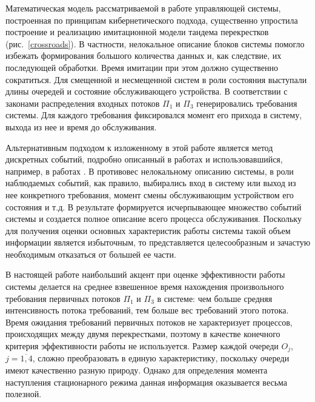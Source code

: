 
Математическая модель рассматриваемой в работе управляющей системы, построенная по принципам кибернетического подхода, существенно упростила построение и реализацию имитационной модели тандема перекрестков (рис.~\ref{crossroads}). В частности, нелокальное описание блоков системы помогло избежать формирования большого количества данных и, как следствие, их последующей обработки. Время имитации при этом должно существенно сократиться. Для смещенной и несмещенной систем в роли состояния выступали длины очередей и состояние обслуживающего устройства. В соответствии с законами распределения входных потоков  $\Pi_1$ и $\Pi_3$ генерировались требования системы. Для каждого требования фиксировался момент его прихода в систему, выхода из нее и время до обслуживания.

Альтернативным подходом к изложенному в этой работе является метод дискретных событий, подробно описанный в работах  \cite{AsmussenGlynn,Simulation} и использовавшийся, например, в работах \cite{FedotkinRachinskaya:2016,FedotkinADissertation}. В противовес нелокальному описанию системы, в роли наблюдаемых событий, как правило, выбирались вход в систему или выход из нее конкретного требования, момент смены обслуживающим устройством его состояния и т.д. В результате формируется исчерпывающее множество событий системы и создается полное описание всего процесса обслуживания. Поскольку для получения оценки основных характеристик работы системы такой объем информации является избыточным, то представляется целесообразным и зачастую необходимым отказаться от большей ее части.

В настоящей работе наибольший акцент при оценке эффективности работы системы делается на среднее взвешенное время нахождения произвольного требования первичных потоков $\Pi_1$ и $\Pi_3$ в системе: чем больше средняя интенсивность потока требований, тем больше вес требований этого потока. Время ожидания требований первичных потоков не характеризует процессов, происходящих между двумя перекрестками, поэтому в качестве конечного критерия эффективности работы не используется. Размер каждой очереди $O_j$, $j=\overline{1,4}$, сложно преобразовать в единую характеристику, поскольку очереди имеют качественно разную природу. Однако для определения момента наступления стационарного режима данная информация оказывается весьма полезной.

